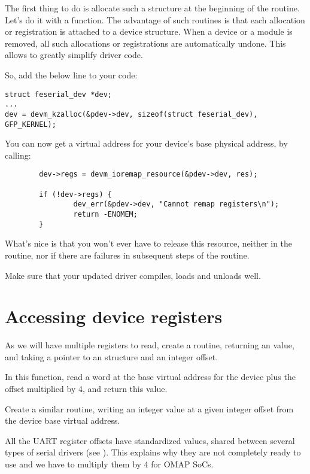 The first thing to do is allocate such a structure at the beginning
of the  routine. Let's do it with a  function.
The advantage of such routines is that each allocation or registration
is attached to a device structure. When a device or a module is removed,
all such allocations or registrations are automatically undone. This
allows to greatly simplify driver code.

So, add the below line to your code:

\begin{verbatim}
struct feserial_dev *dev;
...
dev = devm_kzalloc(&pdev->dev, sizeof(struct feserial_dev), GFP_KERNEL);
\end{verbatim}

You can now get a virtual address for your device's base physical
address, by calling:

\begin{verbatim}
        dev->regs = devm_ioremap_resource(&pdev->dev, res);

        if (!dev->regs) {
                dev_err(&pdev->dev, "Cannot remap registers\n");
                return -ENOMEM;
        }
\end{verbatim}

What's nice is that you won't ever have to release this resource,
neither in the  routine, nor if there are failures
in subsequent steps of the  routine.

Make sure that your updated driver compiles, loads and unloads well.

\section{Accessing device registers}

As we will have multiple registers to read, create a 
routine, returning an  value, and  taking a 
pointer to an  structure and an  integer
offset.

In this function, read a word at the base virtual address
for the device plus the offset multiplied by 4, and return this value.

Create a similar  routine, writing an integer value
at a given integer offset from the device base virtual address.

All the UART register offsets have standardized values, shared between
several types of serial drivers (see
). This explains why they are not
completely ready to use and we have to multiply them by 4 for OMAP SoCs.

